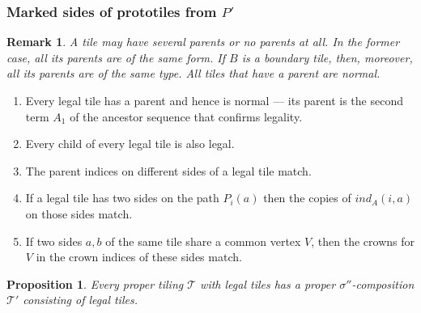 \documentclass[10pt,a4paper]{amsart}
\newcommand{\ind}{\textit{ind}}
\newtheorem{remark}{Remark}
\newtheorem{prop}{Proposition}
\begin{document}
\subsubsection{Marked sides of prototiles from $P'$}\label{smarked}

\begin{remark}\label{rem-parent}
A tile may have several parents or no parents at all. In the former case, all its parents
are of the same form. If $B$ is a boundary tile, then, moreover, all its parents
are of the same type. All tiles that have a parent are normal.
\end{remark}

\renewcommand{\labelenumi}{S\theenumi:}
\begin{enumerate}
\item Every legal tile has a parent and hence is  normal --- its parent is 
the second term $A_1$ of the
ancestor sequence that confirms legality.
\label{s1}
\item Every child of every legal tile is also legal.\label{s3}
\item The parent indices on different sides of a legal tile
match. \label{s2}
\item
If a legal tile has two sides on the path $P_i(a)$
then the copies of  $\ind_A(i,a)$
on those sides 
match.\label{s6}
\item
If two sides $a,b$ of the same tile share a common vertex $V$, then the crowns for $V$
in the crown indices of these sides match.\label{s7}
\end{enumerate}

\begin{prop} \label{th2}
  Every proper tiling $\mathcal T$ with legal tiles has a 
proper $\sigma''$-composition $\mathcal T'$ consisting of legal tiles.
 \end{prop}
\end{document}
